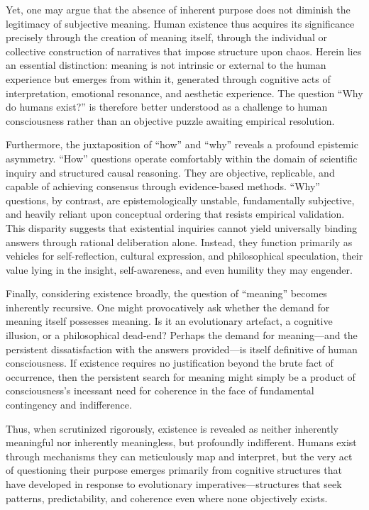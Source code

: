 \documentclass[
  10pt,
]{article}
\begin{document}
Yet, one may argue that the absence of inherent purpose does not
diminish the legitimacy of subjective meaning. Human existence thus
acquires its significance precisely through the creation of meaning
itself, through the individual or collective construction of narratives
that impose structure upon chaos. Herein lies an essential distinction:
meaning is not intrinsic or external to the human experience but emerges
from within it, generated through cognitive acts of interpretation,
emotional resonance, and aesthetic experience. The question ``Why do
humans exist?'' is therefore better understood as a challenge to human
consciousness rather than an objective puzzle awaiting empirical
resolution.

Furthermore, the juxtaposition of ``how'' and ``why'' reveals a profound
epistemic asymmetry. ``How'' questions operate comfortably within the
domain of scientific inquiry and structured causal reasoning. They are
objective, replicable, and capable of achieving consensus through
evidence-based methods. ``Why'' questions, by contrast, are
epistemologically unstable, fundamentally subjective, and heavily
reliant upon conceptual ordering that resists empirical validation. This
disparity suggests that existential inquiries cannot yield universally
binding answers through rational deliberation alone. Instead, they
function primarily as vehicles for self-reflection, cultural expression,
and philosophical speculation, their value lying in the insight,
self-awareness, and even humility they may engender.

Finally, considering existence broadly, the question of ``meaning''
becomes inherently recursive. One might provocatively ask whether the
demand for meaning itself possesses meaning. Is it an evolutionary
artefact, a cognitive illusion, or a philosophical dead-end? Perhaps the
demand for meaning---and the persistent dissatisfaction with the answers
provided---is itself definitive of human consciousness. If existence
requires no justification beyond the brute fact of occurrence, then the
persistent search for meaning might simply be a product of
consciousness's incessant need for coherence in the face of fundamental
contingency and indifference.

Thus, when scrutinized rigorously, existence is revealed as neither
inherently meaningful nor inherently meaningless, but profoundly
indifferent. Humans exist through mechanisms they can meticulously map
and interpret, but the very act of questioning their purpose emerges
primarily from cognitive structures that have developed in response to
evolutionary imperatives---structures that seek patterns,
predictability, and coherence even where none objectively exists.
\end{document}
